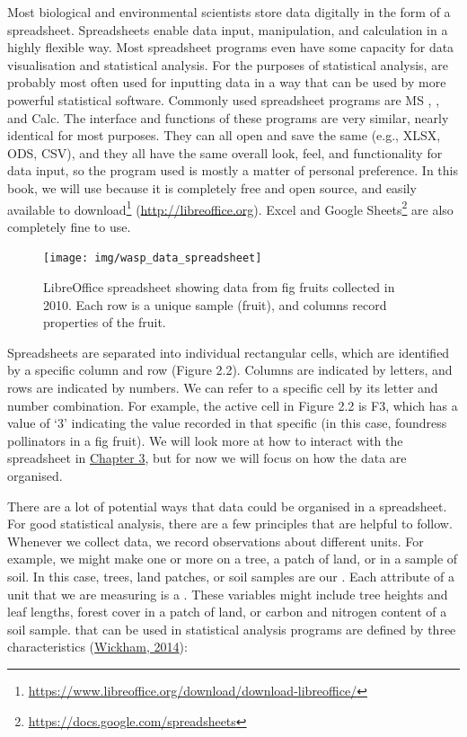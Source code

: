\documentclass[
  openany]{krantz}
\renewcommand{\href}[2]{#2\footnote{\url{#1}}}
\begin{document}
Most biological and environmental scientists store data digitally in the form of a spreadsheet.
Spreadsheets enable data input, manipulation, and calculation in a highly flexible way.
Most spreadsheet programs even have some capacity for data visualisation and statistical analysis.
For the purposes of statistical analysis,  are probably most often used for inputting data in a way that can be used by more powerful statistical software.
Commonly used spreadsheet programs are MS , , and  Calc.
The interface and functions of these programs are very similar, nearly identical for most purposes.
They can all open and save the same  (e.g., XLSX, ODS, CSV), and they all have the same overall look, feel, and functionality for data input, so the program used is mostly a matter of personal preference.
In this book, we will use  because it is completely free and open source, and easily available to \href{https://www.libreoffice.org/download/download-libreoffice/}{download} (\url{http://libreoffice.org}).
Excel and \href{https://docs.google.com/spreadsheets}{Google Sheets} are also completely fine to use.

\begin{figure}
\texttt{[image: img/wasp\_data\_spreadsheet]} \caption{LibreOffice spreadsheet showing data from fig fruits collected in 2010. Each row is a unique sample (fruit), and columns record properties of the fruit.}\label{fig:unnamed-chunk-5}
\end{figure}

Spreadsheets are separated into individual rectangular cells, which are identified by a specific column and row (Figure 2.2).
Columns are indicated by letters, and rows are indicated by numbers.
We can refer to a specific cell by its letter and number combination.
For example, the active cell in Figure 2.2 is F3, which has a value of `3' indicating the value recorded in that specific  (in this case, foundress pollinators in a fig fruit).
We will look more at how to interact with the spreadsheet in \protect\hyperlink{Chapter_3}{Chapter 3}, but for now we will focus on how the data are organised.

There are a lot of potential ways that data could be organised in a spreadsheet.
For good statistical analysis, there are a few principles that are helpful to follow.
Whenever we collect data, we record observations about different units.
For example, we might make one or more  on a tree, a patch of land, or in a sample of soil.
In this case, trees, land patches, or soil samples are our \textbf{}.
Each attribute of a unit that we are measuring is a \textbf{}.
These variables might include tree heights and leaf lengths, forest cover in a patch of land, or carbon and nitrogen content of a soil sample.
 that can be used in statistical analysis programs are defined by three characteristics (\protect\hyperlink{ref-Wickham2014}{Wickham, 2014}):
\end{document}
